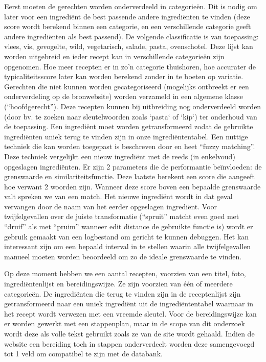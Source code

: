 \documentclass{hogent-article}
\begin{document}
Eerst moeten de gerechten worden onderverdeeld in categorieën. Dit is nodig om later voor een ingrediënt de best passende andere ingrediënten te vinden (deze score wordt berekend binnen een categorie, en een verschillende categorie geeft andere ingrediënten als best passend). De volgende classificatie is van toepassing: vlees, vis, gevogelte, wild, vegetarisch, salade, pasta, ovenschotel. Deze lijst kan worden uitgebreid en ieder recept kan in verschillende categorieën zijn opgenomen. Hoe meer recepten er in zo'n categorie thuishoren, hoe accurater de typicaliteitsscore \autocite{Yokoi2015} later kan worden berekend zonder in te boeten op variatie. Gerechten die niet kunnen worden gecategoriseerd (mogelijks ontbreekt er een onderverdeling op de bronwebsite) worden verzameld in een algemene klasse (“hoofdgerecht”). Deze recepten kunnen bij uitbreiding nog onderverdeeld worden (door bv. te zoeken naar sleutelwoorden zoals `pasta` of `kip`) ter onderhoud van de toepassing.
Een ingrediënt moet worden getransformeerd zodat de gebruikte ingrediënten uniek terug te vinden zijn in onze ingrediëntentabel. Een nuttige techniek die kan worden toegepast is beschreven door \textcite{Chaudhuri2003} en heet “fuzzy matching”. Deze techniek vergelijkt een nieuw ingrediënt met de reeds (in enkelvoud) opgeslagen ingrediënten. Er zijn 2 parameters die de performantie beïnvloeden: de grenswaarde en similariteitsfunctie. Deze laatste berekent een score die aangeeft hoe verwant 2 woorden zijn. Wanneer deze score boven een bepaalde grenswaarde valt spreken we van een match. Het nieuwe ingrediënt wordt in dat geval vervangen door de naam van het eerder opgeslagen ingrediënt. Voor twijfelgevallen over de juiste transformatie (“spruit” matcht even goed met “druif” als met “pruim” wanneer edit distance \autocite{Chaudhuri2003} de gebruikte functie is) wordt er gebruik gemaakt van een logbestand om gericht te kunnen debuggen. Het kan interessant zijn om een bepaald interval in te stellen waarin alle twijfelgevallen manueel moeten worden beoordeeld om zo de ideale grenswaarde te vinden.

Op deze moment hebben we een aantal recepten, voorzien van een titel, foto, ingrediëntenlijst en bereidingswijze. Ze zijn voorzien van één of meerdere categorieën. De ingrediënten die terug te vinden zijn in de receptenlijst zijn getransformeerd naar een uniek ingrediënt uit de ingrediëntentabel waarnaar in het recept wordt verwezen met een vreemde sleutel. Voor de bereidingswijze kan er worden gewerkt met een stappenplan, maar in de scope van dit onderzoek wordt deze als volle tekst gebruikt zoals ze van de site wordt gehaald. Indien de website een bereiding toch in stappen onderverdeelt worden deze samengevoegd tot 1 veld om compatibel te zijn met de databank.
\end{document}
